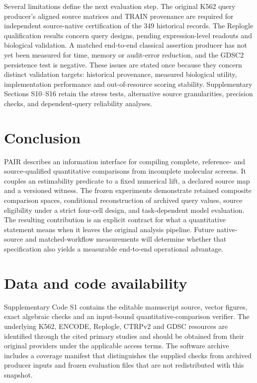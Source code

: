 \documentclass[preprint,11pt,times,number,sort&compress]{elsarticle}
\begin{document}
Several limitations define the next evaluation step. The original K562 query producer's aligned source matrices and TRAIN provenance are required for independent source-native certification of the 349 historical records. The Replogle qualification results concern query designs, pending expression-level readouts and biological validation. A matched end-to-end classical assertion producer has not yet been measured for time, memory or audit-error reduction, and the GDSC2 persistence test is negative. These issues are stated once because they concern distinct validation targets: historical provenance, measured biological utility, implementation performance and out-of-resource scoring stability. Supplementary Sections S10--S16 retain the stress tests, alternative source granularities, precision checks, and dependent-query reliability analyses.

\section{Conclusion}
PAIR describes an information interface for compiling complete, reference- and source-qualified quantitative comparisons from incomplete molecular screens. It couples an estimability predicate to a fixed numerical lift, a declared source map and a versioned witness. The frozen experiments demonstrate retained composite comparison spaces, conditional reconstruction of archived query values, source eligibility under a strict four-cell design, and task-dependent model evaluation. The resulting contribution is an explicit contract for what a quantitative statement means when it leaves the original analysis pipeline. Future native-source and matched-workflow measurements will determine whether that specification also yields a measurable end-to-end operational advantage.

\section*{Data and code availability}
Supplementary Code S1 contains the editable manuscript source, vector figures, exact algebraic checks and an input-bound quantitative-comparison verifier. The underlying K562, ENCODE, Replogle, CTRPv2 and GDSC resources are identified through the cited primary studies and should be obtained from their original providers under the applicable access terms. The software archive includes a coverage manifest that distinguishes the supplied checks from archived producer inputs and frozen evaluation files that are not redistributed with this snapshot.
\end{document}
